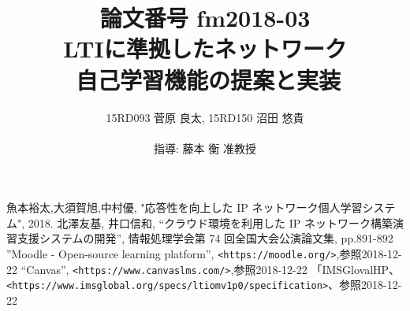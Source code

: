 \documentclass[twocolumn, a4paper]{jsarticle}
\title{\fontsize{10pt}{0pt}\selectfont 論文番号 fm2018-03\\ \fontsize{14pt}{0pt}\selectfont LTIに準拠したネットワーク\\自己学習機能の提案と実装}
\author{\fontsize{11pt}{0pt}\selectfont 15RD093 菅原 良太, 15RD150 沼田 悠貴\\ \\指導: 藤本 衡 准教授}
\date{}
\begin{document}
\twocolumn[
\pagestyle{normal}
\maketitle
]
\thispagestyle{normal}

\fontsize{9pt}{0pt}\selectfont











\begin{thebibliography}{9999999}
   魚本裕太,大須賀旭,中村優, "応答性を向上した
IP ネットワーク個人学習システム", 2018.
   北澤友基, 井口信和, “クラウド環境を利用した IP ネットワーク構築演習支援システムの開発”, 情報処理学会第 74 回全国大会公演論文集, pp.891-892
   ”Moodle - Open-source learning platform”, \texttt{<https://moodle.org/>},参照2018-12-22
   “Canvas”, \texttt{<https://www.canvaslms.com/>},参照2018-12-22
   「IMSGlovalHP、
  \texttt{<https://www.imsglobal.org/specs/ltiomv1p0/specification>}、参照2018-12-22
\end{thebibliography}


\end{document}
